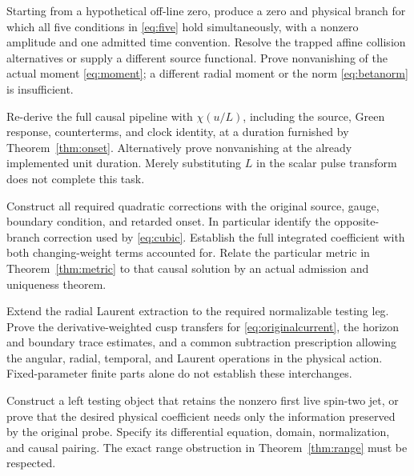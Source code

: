 \begin{problem}\label{prob:excite}
Starting from a hypothetical off-line zero, produce a zero and physical branch for which all five conditions in \eqref{eq:five} hold simultaneously, with a nonzero amplitude and one admitted time convention. Resolve the trapped affine collision alternatives or supply a different source functional. Prove nonvanishing of the actual moment \eqref{eq:moment}; a different radial moment or the norm \eqref{eq:betanorm} is insufficient.
\end{problem}

\begin{problem}
Re-derive the full causal pipeline with \(\chi(u/L)\), including the source, Green response, counterterms, and clock identity, at a duration furnished by Theorem~\ref{thm:onset}. Alternatively prove nonvanishing at the already implemented unit duration. Merely substituting \(L\) in the scalar pulse transform does not complete this task.
\end{problem}

\begin{problem}\label{prob:action}
Construct all required quadratic corrections with the original source, gauge, boundary condition, and retarded onset. In particular identify the opposite-branch correction used by \eqref{eq:cubic}. Establish the full integrated coefficient with both changing-weight terms accounted for. Relate the particular metric in Theorem~\ref{thm:metric} to that causal solution by an actual admission and uniqueness theorem.
\end{problem}

\begin{problem}
Extend the radial Laurent extraction to the required normalizable testing leg. Prove the derivative-weighted cusp transfers for \eqref{eq:originalcurrent}, the horizon and boundary trace estimates, and a common subtraction prescription allowing the angular, radial, temporal, and Laurent operations in the physical action. Fixed-parameter finite parts alone do not establish these interchanges.
\end{problem}

\begin{problem}
Construct a left testing object that retains the nonzero first live spin-two jet, or prove that the desired physical coefficient needs only the information preserved by the original probe. Specify its differential equation, domain, normalization, and causal pairing. The exact range obstruction in Theorem~\ref{thm:range} must be respected.
\end{problem}

